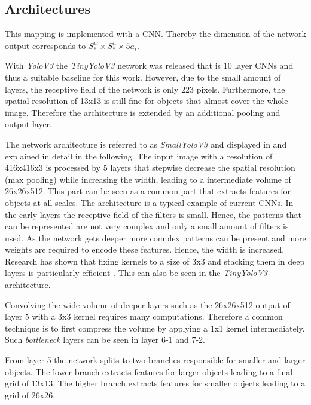 \subsection{Architectures}

This mapping is implemented with a \ac{CNN}. Thereby the dimension of the network output corresponds to $S^w_*\times S^h_*\times 5a_i$.

With \textit{YoloV3} the \textit{TinyYoloV3} network was released that is 10 layer \acp{CNN} and thus a suitable baseline for this work. However, due to the small amount of layers, the receptive field of the network is only 223 pixels. Furthermore, the spatial resolution of 13x13 is still fine for objects that almost cover the whole image. Therefore the architecture is extended by an additional pooling and output layer. 

The network architecture is referred to as \textit{SmallYoloV3} and displayed in  and explained in detail in the following. The input image with a resolution of 416x416x3 is processed by 5 layers that stepwise decrease the spatial resolution (max pooling) while increasing the width, leading to a intermediate volume of 26x26x512. This part can be seen as a common part that extracts features for objects at all scales. The architecture is a typical example of current \acp{CNN}. In the early layers the receptive field of the filters is small. Hence, the patterns that can be represented are not very complex and only a small amount of filters is used. As the network gets deeper more complex patterns can be present and more weights are required to encode these features. Hence, the width is increased. Research has shown that fixing kernels to a size of 3x3 and stacking them in deep layers is particularly efficient . This can also be seen in the \textit{TinyYoloV3} architecture. 

Convolving the wide volume of deeper layers such as the 26x26x512  output of layer 5 with a 3x3 kernel requires many computations. Therefore a common technique is to first compress the volume by applying a 1x1 kernel intermediately. Such \textit{bottleneck} layers can be seen in layer 6-1 and 7-2.

From layer 5 the network splits to two branches responsible for smaller and larger objects. The lower branch extracts features for larger objects leading to a final grid of 13x13. The higher branch extracts features for smaller objects leading to a grid of 26x26.

